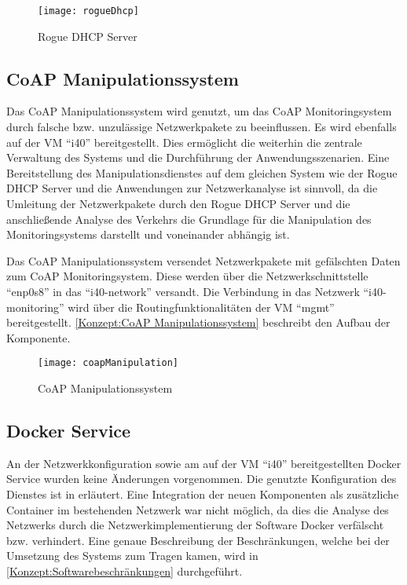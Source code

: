\begin{figure}[h]
  \centering
  \texttt{[image: rogueDhcp]}
  \caption{Rogue DHCP Server} 
  \label{Konzept:Rogue DHCP Server}
\end{figure}

\subsection{CoAP Manipulationssystem}
Das \ac{CoAP} Manipulationssystem wird genutzt, um das \ac{CoAP} Monitoringsystem durch falsche bzw. unzulässige Netzwerkpakete zu beeinflussen. Es wird ebenfalls auf der \ac{VM} "`i40"' bereitgestellt. Dies ermöglicht die weiterhin die zentrale Verwaltung des Systems und die Durchführung der Anwendungsszenarien. Eine Bereitstellung des Manipulationsdienstes auf dem gleichen System wie der Rogue \ac{DHCP} Server und die Anwendungen zur Netzwerkanalyse ist sinnvoll, da die Umleitung der Netzwerkpakete durch den Rogue \ac{DHCP} Server und die anschließende Analyse des Verkehrs die Grundlage für die Manipulation des Monitoringsystems darstellt und voneinander abhängig ist.

Das \ac{CoAP} Manipulationssystem versendet Netzwerkpakete mit gefälschten Daten zum \ac{CoAP} Monitoringsystem. Diese werden über die Netzwerkschnittstelle "`enp0s8"' in das "`i40-network"' versandt. Die Verbindung in das Netzwerk "`i40-monitoring"' wird über die Routingfunktionalitäten der \ac{VM} "`mgmt"' bereitgestellt. \autoref{Konzept:CoAP Manipulationssystem} beschreibt den Aufbau der Komponente.

\begin{figure}[h]
  \centering
  \texttt{[image: coapManipulation]}
  \caption{CoAP Manipulationssystem} 
  \label{Konzept:CoAP Manipulationssystem}
\end{figure}

\subsection{Docker Service}
An der Netzwerkkonfiguration sowie am auf der \ac{VM} "`i40"' bereitgestellten Docker Service wurden keine Änderungen vorgenommen. Die genutzte Konfiguration des Dienstes ist in \cite{Weber2018} erläutert. Eine Integration der neuen Komponenten als zusätzliche Container im bestehenden Netzwerk war nicht möglich, da dies die Analyse des Netzwerks durch die Netzwerkimplementierung der Software Docker verfälscht bzw. verhindert. Eine genaue Beschreibung der Beschränkungen, welche bei der Umsetzung des Systems zum Tragen kamen, wird in \autoref{Konzept:Softwarebeschränkungen} durchgeführt.

